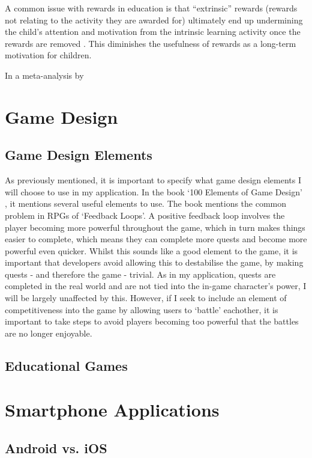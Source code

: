 A common issue with rewards in education is that ``extrinsic'' rewards (rewards not relating to the activity they are awarded for) ultimately end up undermining the child's attention and motivation from the intrinsic learning activity once the rewards are removed \citep{deci2001extrinsic}\citep{ACP:ACP2350090502}.
This diminishes the usefulness of rewards as a long-term motivation for children.

In a meta-analysis by \cite{deci2001extrinsic} 



\section{Game Design}

\subsection{Game Design Elements}
As previously mentioned, it is important to specify what game design elements I will choose to use in my application.
In the book `100 Elements of Game Design' \citep{despain2012100}, it mentions several useful elements to use.
The book mentions the common problem in RPGs of `Feedback Loops'.
A positive feedback loop involves the player becoming more powerful throughout the game, which in turn makes things easier to complete, which means they can complete more quests and become more powerful even quicker.
Whilst this sounds like a good element to the game, it is important that developers avoid allowing this to destabilise the game, by making quests - and therefore the game - trivial.
As in my application, quests are completed in the real world and are not tied into the in-game character's power, I will be largely unaffected by this.
However, if I seek to include an element of competitiveness into the game by allowing users to `battle' eachother, it is important to take steps to avoid players becoming too powerful that the battles are no longer enjoyable.

\subsection{Educational Games}



\section{Smartphone Applications}

\subsection{Android vs. iOS}
